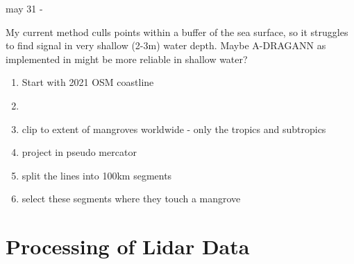 may 31 -

My current method culls points within a buffer of the sea surface, so it struggles to find signal in very shallow (2-3m) water depth. Maybe A-DRAGANN as implemented in \cite{Cao2021} might be more reliable in shallow water?
\begin{enumerate}
    \color{orange}
    \item Start with 2021 OSM coastline
    \item 
    \item clip to extent of mangroves worldwide - only the tropics and subtropics
    \item project in pseudo mercator
    \item split the lines into 100km segments
    \item select these segments where they touch a mangrove 
\end{enumerate}


\section{Processing of Lidar Data}

